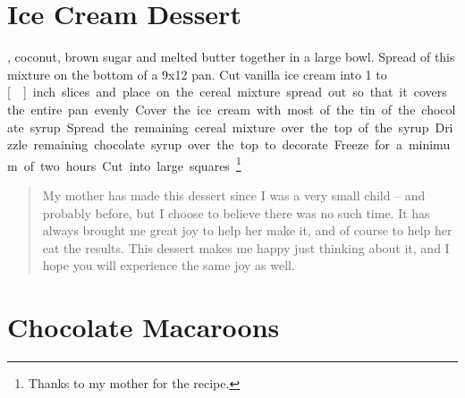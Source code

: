 \documentclass{tufte-book}
\begin{document}
\section{Ice Cream Dessert}

, coconut, brown sugar and melted butter together in a large bowl. Spread  of this mixture on the bottom of a 9x12 pan. Cut vanilla ice cream into 1 to \unit[]{inch} slices and place on the cereal mixture spread out so that it covers the entire pan evenly. Cover the ice cream with most of the tin of the chocolate syrup. Spread the remaining cereal mixture over the top of the syrup. Drizzle remaining chocolate syrup over the top to decorate. Freeze for a minimum of two hours. Cut into large squares. \footnote{Thanks to my mother for the recipe.}

\begin{quote}
My mother has made this dessert since I was a very small child -- and probably before, but I choose to believe there was no such time. It has always brought me great joy to help her make it, and of course to help her eat the results. This dessert makes me happy just thinking about it, and I hope you will experience the same joy as well.
\end{quote}

\section{Chocolate Macaroons}
\end{document}
